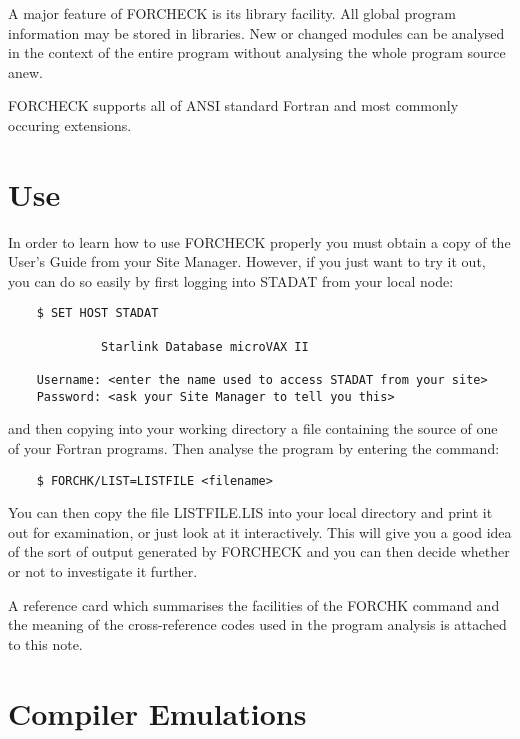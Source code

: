 \documentclass[11pt,twoside]{article}
\newcommand{\xlabel}[1]{}
\begin{document}
A major feature of FORCHECK is its library facility.
All global program information may be stored in libraries.
New or changed modules can be analysed in the context of the entire program
without analysing the whole program source anew.

FORCHECK supports all of ANSI standard Fortran and most commonly occuring
extensions.

\section{Use\xlabel{use}}

In order to learn how to use FORCHECK properly you must obtain a copy of the
User's Guide from your Site Manager.
However, if you just want to try it out, you can do so easily by first logging
into STADAT from your local node:
\begin{verbatim}
    $ SET HOST STADAT

             Starlink Database microVAX II

    Username: <enter the name used to access STADAT from your site>
    Password: <ask your Site Manager to tell you this>
\end{verbatim}
and then copying into your working directory a file containing the source of
one of your Fortran programs.
Then analyse the program by entering the command:
\begin{verbatim}
    $ FORCHK/LIST=LISTFILE <filename>
\end{verbatim}
You can then copy the file LISTFILE.LIS into your local directory and print it
out for examination, or just look at it interactively.
This will give you a good idea of the sort of output generated by FORCHECK
and you can then decide whether or not to investigate it further.

A reference card which summarises the facilities of the FORCHK command and
the meaning of the cross-reference codes used in the program analysis is
attached to this note.

\section{Compiler Emulations\xlabel{compiler_emulations}}
\end{document}
